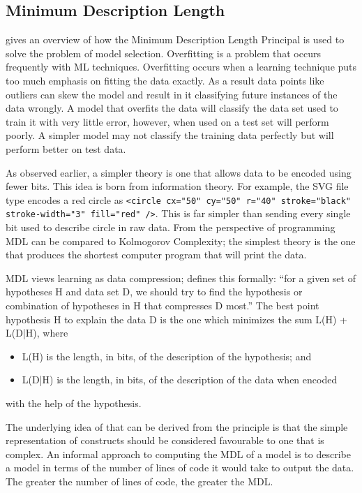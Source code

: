 \subsection{Minimum Description Length}

\cite{grunwald2005tutorial} gives an overview of how the Minimum Description Length Principal is used to solve the problem of model selection. Overfitting is a problem that occurs frequently with ML techniques. Overfitting occurs when a learning technique puts too much emphasis on fitting the data exactly. As a result data points like outliers can skew the model and result in it classifying future instances of the data wrongly. A model that overfits the data will classify the data set used to train it with very little error, however, when used on a test set will perform poorly. A simpler model may not classify the training data perfectly but will perform better on test data.

As observed earlier, a simpler theory is one that allows data to be encoded using fewer bits. This idea is born from information theory. For example, the SVG file type encodes a red circle as \lstinline{<circle cx="50" cy="50" r="40" stroke="black" stroke-width="3" fill="red" />}. This is far simpler than sending every single bit used to describe circle in raw data. From the perspective of programming MDL can be compared to Kolmogorov Complexity; the simplest theory is the one that produces the shortest computer program that will print the data.

MDL views learning as data compression; \cite{grunwald2005tutorial} defines this formally: ``for a given set of hypotheses H and data set D, we should try to find the hypothesis or combination of hypotheses in H that compresses D most.'' The best point hypothesis H to explain the data D is the one which minimizes the sum L(H) + L(D|H), where
\begin{itemize}
  \item L(H) is the length, in bits, of the description of the hypothesis; and
  \item L(D|H) is the length, in bits, of the description of the data when encoded
\end{itemize}
with the help of the hypothesis.

The underlying idea of that can be derived from the principle is that the simple representation of constructs should be considered favourable to one that is complex. An informal approach to computing the MDL of a model is to describe a model in terms of the number of lines of code it would take to output the data. The greater the number of lines of code, the greater the MDL.

